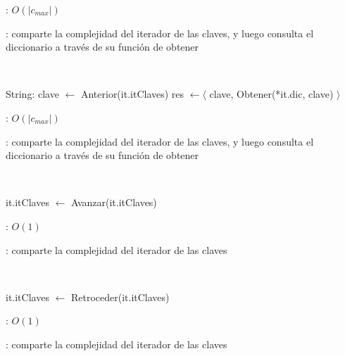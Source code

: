 \begin{Algoritmos}
	\complejidad: $O(|c_{max}|)$

	\justifcomp: comparte la complejidad del iterador de las claves, y luego consulta el diccionario a través de su función de obtener

	~

	\begin{algorithm}[H]
		\NoCaptionOfAlgo
		\caption{}
		String: clave $\leftarrow$ Anterior(it.itClaves)
		res $\leftarrow \langle$ clave, Obtener(*it.dic, clave) $\rangle$
	\end{algorithm}

	\complejidad: $O(|c_{max}|)$

	\justifcomp: comparte la complejidad del iterador de las claves, y luego consulta el diccionario a través de su función de obtener

	~

	\begin{algorithm}[H]
		\NoCaptionOfAlgo
		\caption{}
		it.itClaves $\leftarrow$ Avanzar(it.itClaves)
	\end{algorithm}

	\complejidad: $O(1)$

	\justifcomp: comparte la complejidad del iterador de las claves

	~

	\begin{algorithm}[H]
		\NoCaptionOfAlgo
		\caption{}
		it.itClaves $\leftarrow$ Retroceder(it.itClaves)
	\end{algorithm}

	\complejidad: $O(1)$

	\justifcomp: comparte la complejidad del iterador de las claves

\end{Algoritmos}